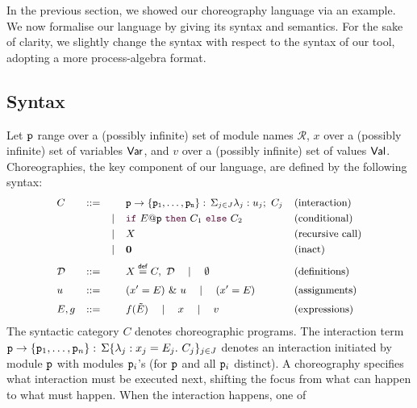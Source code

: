 In the previous section, we showed our choreography language via an
example. We now formalise our language by giving its syntax and
semantics. For the sake of clarity, we slightly change the syntax with
respect to the syntax of our tool, adopting a more process-algebra
format.

\subsection{Syntax} 
%
Let $\mathtt{p}$ range over a (possibly infinite) set of module names
$\mathcal R$, $x$ over a (possibly infinite) set of variables $\mathsf{Var}$,
and $v$ over a (possibly infinite) set of values $\mathsf{Val}$.
%
Choreographies, the key component of our language, are defined by the
following syntax:
%
\begin{displaymath}\small
  \begin{array}{llllllllllll}
    C & ::= &      & \interact{p}{\role p_1,\ldots,\role p_n} & \text{(interaction)}\\[1mm]
      &     & \mid & \ifTE {E}{p}{C_1}{C_2} & \text{(conditional)}\\[1mm]
      &     & \mid & X     & \text{(recursive call)}\\[1mm]
      &     & \mid & \CEnd & \text{(inact)}
    \\[2mm]
    \defin \ & ::= & & X\stackrel{\mathsf{def}}{=} C,\ \defin 
                     \quad \mid \quad \emptyset & \text{(definitions)}
    \\[2mm]
    u     & ::=  && (x' = E)\ \&\ u \quad\mid\quad    (x' = E) & \text{(assignments)}\\[2mm]
    E, g  & ::=  && f(\tilde E)\quad\mid\quad x\quad\mid\quad v & \text{(expressions)}
  \end{array}
\end{displaymath}
%
The syntactic category $C$ denotes choreographic programs. The
interaction term
$\mathtt{p}\rightarrow \{\mathtt{p}_1,\ldots,\mathtt{p}_n\}:\,\Sigma\{\lambda_j: x_j=E_j.\ C_j\}_{j\in J}$ denotes an
interaction initiated by module $\mathtt{p}$ with modules $\mathtt{p}_i$'s
(for $\mathtt{p}$ and all $\mathtt{p}_i$ distinct). A choreography specifies
what interaction must be executed next, shifting the focus from what
can happen to what must happen. When the interaction happens, one of
